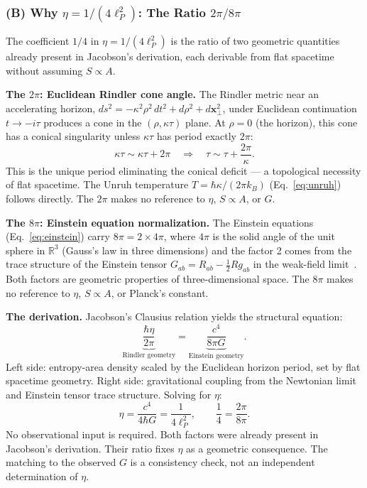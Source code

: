 \documentclass[11pt]{article}
\begin{document}
\subsubsection*{(B) Why $\eta = 1/(4\ell_P^2)$: The Ratio $2\pi/8\pi$}

The coefficient $1/4$ in $\eta = 1/(4\ell_P^2)$ is the ratio of two
geometric quantities already present in Jacobson's derivation, each
derivable from flat spacetime without assuming $S \propto A$.

\textbf{The $2\pi$: Euclidean Rindler cone angle.}
The Rindler metric near an accelerating horizon,
$ds^2 = -\kappa^2\rho^2\,dt^2 + d\rho^2 + d\mathbf{x}_\perp^2$,
under Euclidean continuation $t \to -i\tau$ produces a cone in the
$(\rho, \kappa\tau)$ plane.  At $\rho = 0$ (the horizon), this cone
has a conical singularity unless $\kappa\tau$ has period exactly $2\pi$:
\begin{equation}
\kappa\tau \sim \kappa\tau + 2\pi
\quad\Longrightarrow\quad
\tau \sim \tau + \frac{2\pi}{\kappa}.
\label{eq:rindler_period}
\end{equation}
This is the unique period eliminating the conical deficit --- a
topological necessity of flat spacetime.  The Unruh temperature
$T = \hbar\kappa/(2\pi k_B)$ (Eq.~\ref{eq:unruh}) follows directly.
The $2\pi$ makes no reference to $\eta$, $S \propto A$, or $G$.

\textbf{The $8\pi$: Einstein equation normalization.}
The Einstein equations (Eq.~\ref{eq:einstein}) carry
$8\pi = 2 \times 4\pi$, where $4\pi$ is the solid angle of the unit
sphere in $\mathbb{R}^3$ (Gauss's law in three dimensions) and the
factor 2 comes from the trace structure of the Einstein tensor
$G_{ab} = R_{ab} - \frac{1}{2}Rg_{ab}$ in the weak-field
limit~\citep{Wald1984}.  Both factors are geometric properties of
three-dimensional space.  The $8\pi$ makes no reference to $\eta$,
$S \propto A$, or Planck's constant.

\textbf{The derivation.}
Jacobson's Clausius relation yields the structural equation:
\begin{equation}
\underbrace{\frac{\hbar\eta}{2\pi}}_{\text{Rindler geometry}}
= \underbrace{\frac{c^4}{8\pi G}}_{\text{Einstein geometry}}.
\label{eq:jacobson_structure}
\end{equation}
Left side: entropy-area density scaled by the Euclidean horizon period,
set by flat spacetime geometry.  Right side: gravitational coupling from
the Newtonian limit and Einstein tensor trace structure.  Solving for
$\eta$:
\begin{equation}
\boxed{\eta = \frac{c^4}{4\hbar G} = \frac{1}{4\ell_P^2},
\qquad \frac{1}{4} = \frac{2\pi}{8\pi}.}
\label{eq:eta_derived}
\end{equation}
No observational input is required.  Both factors were already present
in Jacobson's derivation.  Their ratio fixes $\eta$ as a geometric
consequence.  The matching to the observed $G$ is a consistency check,
not an independent determination of $\eta$.
\end{document}
